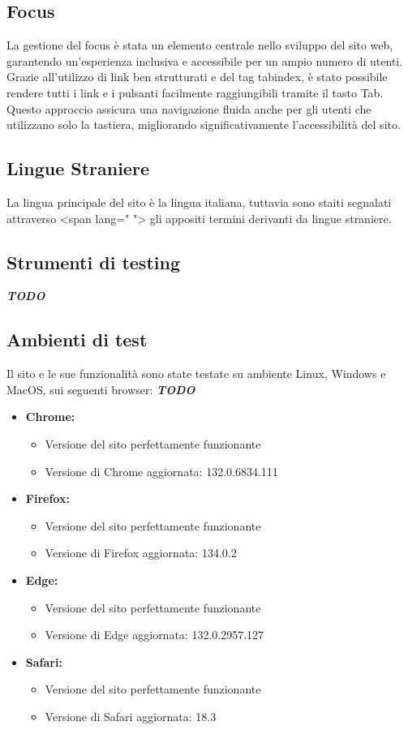 \subsection{Focus}
La gestione del focus è stata un elemento centrale nello sviluppo del sito web, garantendo un’esperienza inclusiva e accessibile per un ampio numero di utenti. Grazie all’utilizzo di link ben strutturati e del tag tabindex, è stato possibile rendere tutti i link e i pulsanti facilmente raggiungibili tramite il tasto Tab. Questo approccio assicura una navigazione fluida anche per gli utenti che utilizzano solo la tastiera, migliorando significativamente l’accessibilità del sito.
\subsection{Lingue Straniere}
La lingua principale del sito è la lingua italiana, tuttavia sono staiti segnalati attraverso <span lang=" "> gli appositi termini derivanti da lingue straniere.
\subsection{Strumenti di testing}
\textbf{\textit{TODO}}
\subsection{Ambienti di test}
Il sito e le sue funzionalità sono state testate su ambiente Linux, Windows e MacOS, sui seguenti browser: \textbf{\textit{TODO}}
\begin{itemize}
    \item \textbf{Chrome:}
        \begin{itemize}
            \item Versione del sito perfettamente funzionante
            \item Versione di Chrome aggiornata: 132.0.6834.111
        \end{itemize}
    \item \textbf{Firefox:}
        \begin{itemize}
            \item Versione del sito perfettamente funzionante
            \item Versione di Firefox aggiornata: 134.0.2
        \end{itemize}
    \item \textbf{Edge:} 
        \begin{itemize}
            \item Versione del sito perfettamente funzionante
            \item Versione di Edge aggiornata: 132.0.2957.127
        \end{itemize}
    \item \textbf{Safari:} 
        \begin{itemize}
            \item Versione del sito perfettamente funzionante
            \item Versione di Safari aggiornata: 18.3
        \end{itemize}
\end{itemize}

